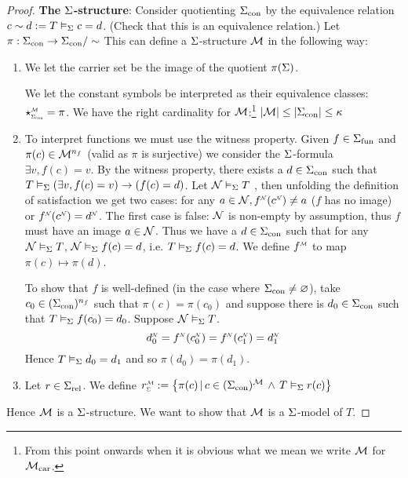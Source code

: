 \begin{proof}
    \textbf{The $\Sigma$-structure}: 
    Consider quotienting ${\Sigma}_\mathrm{con}$ by the equivalence relation
    $c \sim d := T \vDash_{\Sigma} c = d$.
    (Check that this is an equivalence relation.)
    Let $\pi : {\Sigma}_\mathrm{con} \to {\Sigma}_\mathrm{con} / \sim $
    This can define a $\Sigma$-structure $\mathcal{M}$ in the following way:
    \begin{enumerate}
        \item We let the carrier set be the image of the quotient $\pi(\Sigma)$.
        
        We let the constant symbols be interpreted as their equivalence classes:
        $\intp{\const{\Si}}{\MM} = \pi$.
        We have the right cardinality for $\mathcal{M}$:\footnote{From 
            this point onwards when it is obvious what we mean 
            we write $\mathcal{M}$ for ${\mathcal{M}}_\mathrm{car}$.} 
        $|{\mathcal{M}}| \leq |{\Sigma}_\mathrm{con}| \leq \kappa$
        \item To interpret functions we must use the witness property.
        Given $f \in {\Sigma}_\mathrm{fun}$ and $\pi(c) \in \mathcal{M}^{n_f}$
        (valid as $\pi$ is surjective)
        we consider the $\Sigma$-formula 
        $\exists v, f(c) = v$.
        By the witness property, there exists a $d \in {\Sigma}_\mathrm{con}$
        such that $T \vDash_{\Sigma} (\exists v, f(c) = v) \to (f(c) = d)$.
        Let $\mathcal{N} \vDash_{\Sigma} T$ , 
        then unfolding the definition of satisfaction we get two cases:
        for any $a \in {\NN}, \modintp{\NN}{f}(\modintp{\NN}{c}) \ne a$
        ($f$ has no image)
        or $\modintp{\NN}{f}(\modintp{\NN}{c}) = \modintp{\NN}{d}$.
        The first case is false: 
        ${\mathcal{N}}$ is non-empty by assumption, 
        thus $f$ must have an image $a \in {\mathcal{N}}$.
        Thus we have a $d \in {\Sigma}_\mathrm{con}$ such that for any $\mathcal{N} \vDash_{\Sigma} T$,
        $\mathcal{N} \vDash_{\Sigma} f(c) = d$, 
        i.e. $T \vDash_{\Sigma} f(c) = d$.
        We define $\mmintp{f}$ to map $\pi(c) \mapsto \pi(d)$.
        
        To show that $f$ is well-defined 
        (in the case where ${\Sigma}_\mathrm{con} \ne \varnothing$),
        take $c_0 \in ({\Sigma}_\mathrm{con})^{n_f}$ 
        such that $\pi(c) = \pi(c_0)$ and
        suppose there is $d_0 \in {\Sigma}_\mathrm{con}$ 
        such that $T \vDash_{\Sigma} f(c_0) = d_0$.
        Suppose $\mathcal{N} \vDash_{\Sigma} T$.
        \[\modintp{\NN}{d_0} = \modintp{\NN}{f}(\modintp{\NN}{c_0})
        = \modintp{\NN}{f}(\modintp{\NN}{c_1}) = \modintp{\NN}{d_1}\]
        Hence $T \vDash_{\Sigma} d_0 = d_1$ and so $\pi(d_0) = \pi(d_1)$.
        \item Let $r \in {\Sigma}_\mathrm{rel}$. 
        We define $\subintp{\Si}{\MM}{r} := 
        \set{\pi(c) \st c \in (\const{\Si})^{\MM} \AND T \modelsi r(c)}$
    \end{enumerate}
    Hence $\mathcal{M}$ is a $\Sigma$-structure.
    We want to show that $\mathcal{M}$ is a $\Sigma$-model of $T$.


\end{proof}
